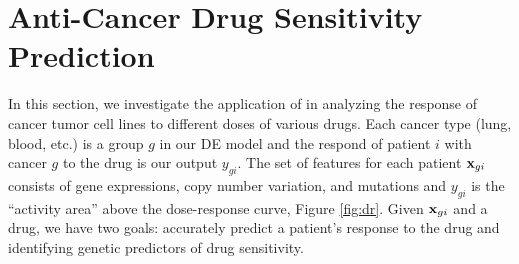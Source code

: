 \section{Anti-Cancer Drug Sensitivity Prediction}
\label{realexp}
In this section, we investigate the application of \dc{} in analyzing the response of cancer tumor cell lines to different doses of various drugs. 
Each cancer type (lung, blood, etc.) is a group $g$ in our DE model and the respond of patient $i$ with cancer $g$ to the drug is our output $y_{gi}$. 
The set of features for each patient $\mathbf{x}_{gi}$ consists of gene expressions, copy number variation, and mutations and $y_{gi}$ is the ``activity area'' above the dose-response curve, Figure \ref{fig:dr}.
Given $\mathbf{x}_{gi}$ and a drug, we have two goals: accurately predict a patient's response to the drug and identifying genetic predictors of drug sensitivity. 
%


